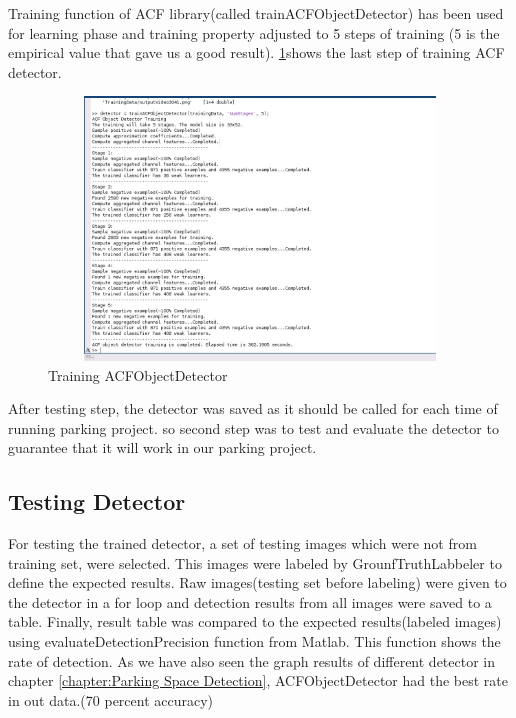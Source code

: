 Training function of ACF library(called trainACFObjectDetector) has been used for learning phase and training property adjusted to 5 steps of training (5 is the empirical value that gave us a good result). \ref{fig:trainACF}shows the last step of training ACF detector.
\begin{figure}
\centering
    \includegraphics[width=12cm, height=7cm]{images/TrainpocessACF.jpg} 
    \caption{Training ACFObjectDetector}
    \label{fig:trainACF}
\end{figure}

After testing step, the detector was saved as it should be called for each time of running parking project. so second step was to test and evaluate the detector to guarantee that it will work in our parking project.
\subsection{Testing Detector} \label{test detector}
For testing the trained detector, a set of testing images which were not from training set, were selected. This images were labeled by GrounfTruthLabbeler to define the expected results. Raw images(testing set before labeling) were given to the detector in a for loop and detection results from all images were saved to a table. Finally, result table was compared to the expected results(labeled images) using evaluateDetectionPrecision function from Matlab. This function shows the rate of detection. As we have also seen the graph results of different detector in chapter \ref{chapter:Parking Space Detection}, ACFObjectDetector had the best rate in out data.(70 percent accuracy)
